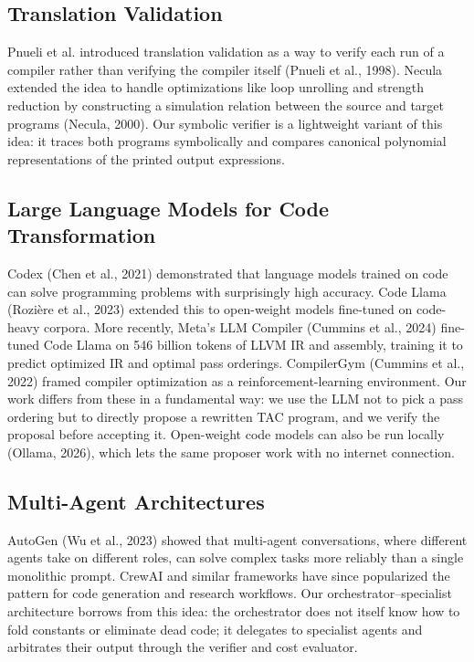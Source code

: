 \documentclass[12pt,a4paper]{report}
\begin{document}
\subsection{Translation Validation}

Pnueli et al. introduced translation validation as a way to verify each run of a compiler rather than verifying the compiler itself (Pnueli et al., 1998). Necula extended the idea to handle optimizations like loop unrolling and strength reduction by constructing a simulation relation between the source and target programs (Necula, 2000). Our symbolic verifier is a lightweight variant of this idea: it traces both programs symbolically and compares canonical polynomial representations of the printed output expressions.

\subsection{Large Language Models for Code Transformation}

Codex (Chen et al., 2021) demonstrated that language models trained on code can solve programming problems with surprisingly high accuracy. Code Llama (Rozi\`ere et al., 2023) extended this to open-weight models fine-tuned on code-heavy corpora. More recently, Meta's LLM Compiler (Cummins et al., 2024) fine-tuned Code Llama on 546 billion tokens of LLVM IR and assembly, training it to predict optimized IR and optimal pass orderings. CompilerGym (Cummins et al., 2022) framed compiler optimization as a reinforcement-learning environment. Our work differs from these in a fundamental way: we use the LLM not to pick a pass ordering but to directly propose a rewritten TAC program, and we verify the proposal before accepting it. Open-weight code models can also be run locally (Ollama, 2026), which lets the same proposer work with no internet connection.

\subsection{Multi-Agent Architectures}

AutoGen (Wu et al., 2023) showed that multi-agent conversations, where different agents take on different roles, can solve complex tasks more reliably than a single monolithic prompt. CrewAI and similar frameworks have since popularized the pattern for code generation and research workflows. Our orchestrator--specialist architecture borrows from this idea: the orchestrator does not itself know how to fold constants or eliminate dead code; it delegates to specialist agents and arbitrates their output through the verifier and cost evaluator.
\end{document}
